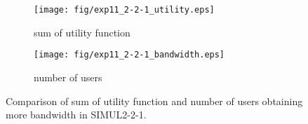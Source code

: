 \begin{figure}
	\begin{center}
		\begin{subfigure}[b]{0.8\textwidth}
			\centering
			\texttt{[image: fig/exp11\_2-2-1\_utility.eps]}
			\caption{sum of utility function}
			\label{figure:simul2_2_1_u_a}
		\end{subfigure}
		\begin{subfigure}[b]{0.8\textwidth}
			\centering
			\texttt{[image: fig/exp11\_2-2-1\_bandwidth.eps]}
			\caption{number of users}
			\label{figure:simul2_2_1_u_b}
		\end{subfigure}
		\caption{Comparison of sum of utility function and number of users obtaining more bandwidth in SIMUL2-2-1.}
		\label{figure:simul2_2_1_u}
	\end{center}
\end{figure}

\clearpage


